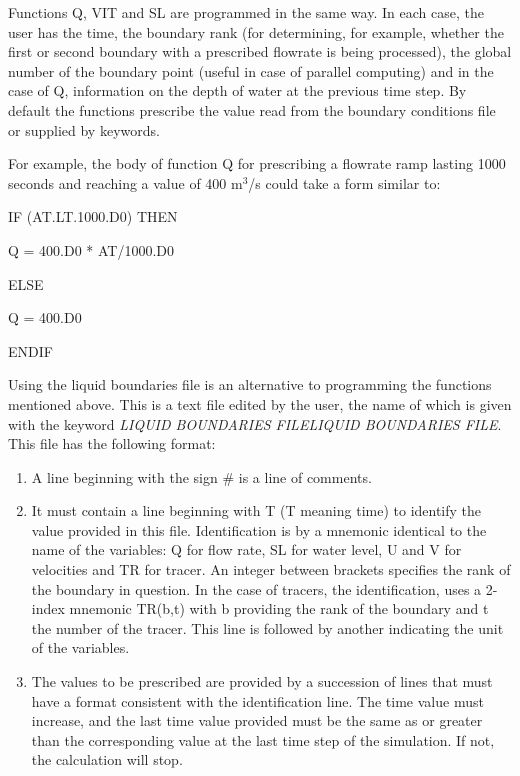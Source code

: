  Functions Q, VIT and SL are programmed in the same way. In each case, the user has the time, the boundary rank (for determining, for example, whether the first or second boundary with a prescribed flowrate is being processed), the global number of the boundary point (useful in case of parallel computing) and in the case of Q, information on the depth of water at the previous time step. By default the functions prescribe the value read from the boundary conditions file or supplied by keywords.

 For example, the body of function Q for prescribing a flowrate ramp lasting 1000 seconds and reaching a value of 400 m${}^{3}$/s could take a form similar to:

 IF (AT.LT.1000.D0) THEN

    Q = 400.D0 * AT/1000.D0

 ELSE

    Q = 400.D0

 ENDIF

 Using the liquid boundaries file is an alternative to programming the functions mentioned above. This is a text file edited by the user, the name of which is given with the keyword \textit{LIQUID BOUNDARIES FILELIQUID BOUNDARIES FILE}. This file has the following format:

\begin{enumerate}
\item  A line beginning with the sign \# is a line of comments.

\item  It must contain a line beginning with T (T meaning time) to identify the value provided in this file. Identification is by a mnemonic identical to the name of the variables: Q for flow rate, SL for water level, U and V for velocities and TR for tracer. An integer between brackets specifies the rank of the boundary in question. In the case of tracers, the identification, uses a 2-index mnemonic TR(b,t) with b providing the rank of the boundary and t the number of the tracer. This line is followed by another indicating the unit of the variables.

\item  The values to be prescribed are provided by a succession of lines that must have a format consistent with the identification line. The time value must increase, and the last time value provided must be the same as or greater than the corresponding value at the last time step of the simulation. If not, the calculation will stop.
\end{enumerate}

